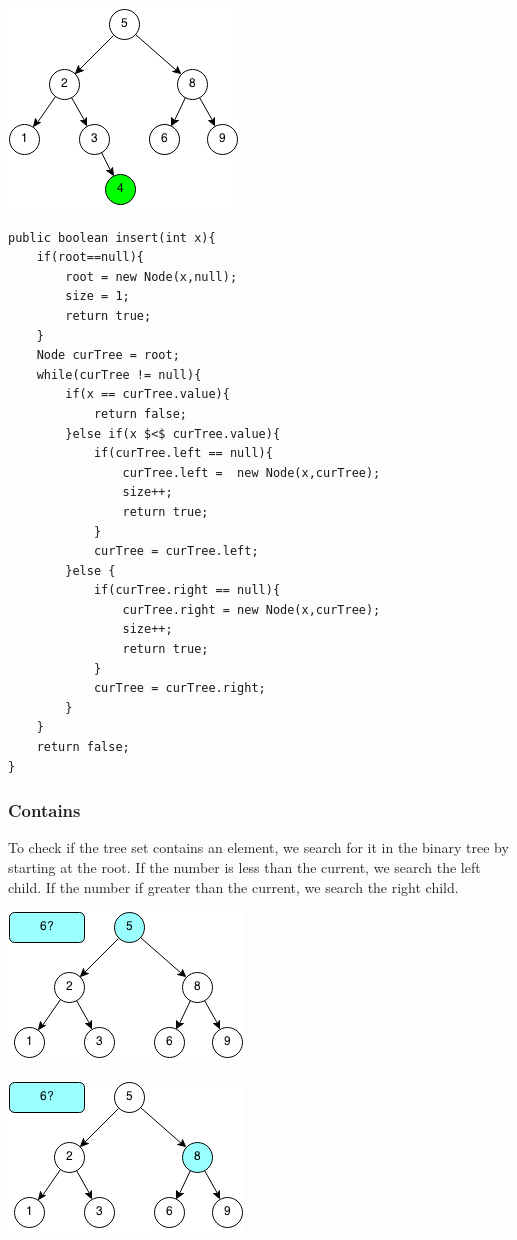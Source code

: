 \documentclass[11pt,oneside]{book}
\makeatletter
\def\maxwidth#1{\ifdim\Gin@nat@width>#1 #1\else\Gin@nat@width\fi}
\makeatother
\begin{document}
\includegraphics[width=\maxwidth{\textwidth}]{bstinsert4.png}

\begin{lstlisting}
public boolean insert(int x){
    if(root==null){
        root = new Node(x,null);
        size = 1;
        return true;
    }
    Node curTree = root;
    while(curTree != null){
        if(x == curTree.value){
            return false;
        }else if(x $<$ curTree.value){
            if(curTree.left == null){
                curTree.left =  new Node(x,curTree);
                size++;
                return true;
            }
            curTree = curTree.left;
        }else {
            if(curTree.right == null){
                curTree.right = new Node(x,curTree);
                size++;
                return true;
            }
            curTree = curTree.right;
        }
    }
    return false;
}
\end{lstlisting}

\subsubsection{Contains}

To check if the tree set contains an element, we search for it in the binary tree by starting at the root. If the number is less than the current, we search the left child. If the number if greater than the current, we search the right child.

\includegraphics[width=\maxwidth{\textwidth}]{bstcontains.png}

\includegraphics[width=\maxwidth{\textwidth}]{bstcontains2.png}
\end{document}
